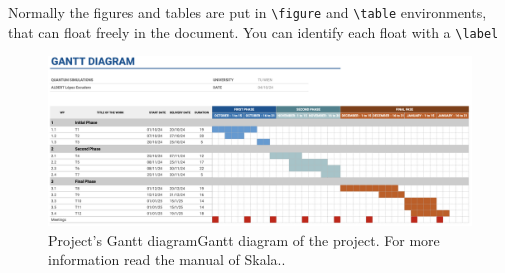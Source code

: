   \label{sec:workplan}

Normally the figures and tables are put in \verb|\figure| and \verb|\table| environments, that can float freely in the document. You can identify each float with a \verb|\label|

\begin{figure}[H]
  \centering
  \includegraphics[width=1\textwidth]{img/Gantt_diagram.png}
  \caption{Project's Gantt diagram{\footnotesize{Gantt diagram of the project. For more information read the manual \cite{skalagantt} of Skala.}.}}
  \label{fig:gantt_diagram}
\end{figure}

